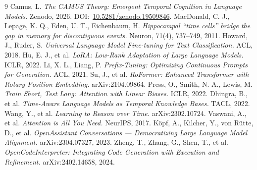 \documentclass[10pt,twocolumn,letterpaper]{article}
\begin{document}
\begin{thebibliography}{9}
\footnotesize
{} Camus, L. \emph{The CAMUS Theory: Emergent Temporal Cognition in Language Models.} Zenodo, 2026. DOI:~\href{https://doi.org/10.5281/zenodo.19509846}{10.5281/zenodo.19509846}.
 MacDonald, C. J., Lepage, K. Q., Eden, U. T., Eichenbaum, H. \emph{Hippocampal ``time cells'' bridge the gap in memory for discontiguous events.} Neuron, 71(4), 737--749, 2011.
 Howard, J., Ruder, S. \emph{Universal Language Model Fine-tuning for Text Classification.} ACL, 2018.
 Hu, E. J., et al. \emph{LoRA: Low-Rank Adaptation of Large Language Models.} ICLR, 2022.
 Li, X. L., Liang, P. \emph{Prefix-Tuning: Optimizing Continuous Prompts for Generation.} ACL, 2021.
 Su, J., et al. \emph{RoFormer: Enhanced Transformer with Rotary Position Embedding.} arXiv:2104.09864.
 Press, O., Smith, N. A., Lewis, M. \emph{Train Short, Test Long: Attention with Linear Biases.} ICLR, 2022.
 Dhingra, B., et al. \emph{Time-Aware Language Models as Temporal Knowledge Bases.} TACL, 2022.
 Wang, Y., et al. \emph{Learning to Reason over Time.} arXiv:2302.10724.
 Vaswani, A., et al. \emph{Attention is All You Need.} NeurIPS, 2017.
 K\"opf, A., Kilcher, Y., von R\"utte, D., et al. \emph{OpenAssistant Conversations --- Democratizing Large Language Model Alignment.} arXiv:2304.07327, 2023.
 Zheng, T., Zhang, G., Shen, T., et al. \emph{OpenCodeInterpreter: Integrating Code Generation with Execution and Refinement.} arXiv:2402.14658, 2024.
\end{thebibliography}
\end{document}
